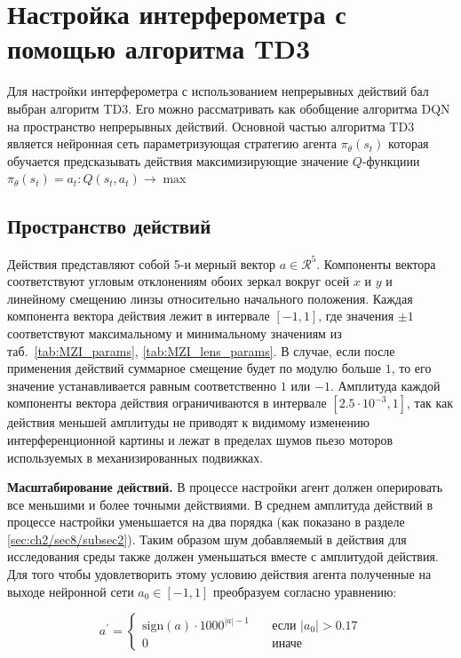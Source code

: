                         
\section{Настройка интерферометра с помощью алгоритма TD3}

Для настройки интерферометра с использованием непрерывных действий бал выбран алгоритм TD3. Его можно рассматривать как обобщение алгоритма DQN на пространство непрерывных действий. Основной частью алгоритма TD3 является нейронная сеть параметризующая стратегию агента $\pi_{\theta}(s_t)$ которая обучается предсказывать действия максимизирующие значение $Q$-функциии $\pi_{\theta}(s_t) = a_t: Q(s_t, a_t) \to \max$

\subsection{Пространство действий}

Действия представляют собой 5-и мерный вектор $a \in \mathcal{R}^5$. Компоненты вектора соответствуют угловым отклонениям обоих зеркал вокруг осей $x$ и $y$ и линейному смещению линзы относительно начального положения. Каждая компонента вектора действия лежит в интервале $[-1,1]$, где значения $\pm 1$ соответствуют максимальному и минимальному значениям из таб.~\ref{tab:MZI_params}, \ref{tab:MZI_lens_params}. В случае, если после применения действий суммарное смещение будет по модулю больше $1$, то его значение устанавливается равным соответственно $1$ или $-1$.
Амплитуда каждой компоненты вектора действия ограничиваются в интервале $[2.5 \cdot 10^{-3}, 1]$, так как действия меньшей амплитуды не приводят к видимому изменению интерференционной картины и лежат в пределах шумов пьезо моторов используемых в механизированных подвижках.

\textbf{Масштабирование действий.} 
В процессе настройки агент должен оперировать все меньшими и более точными действиями. В среднем амплитуда действий в процессе настройки уменьшается на два порядка (как показано в разделе \ref{sec:ch2/sec8/subsec2}). Таким образом шум добавляемый в действия для исследования среды также должен уменьшаться вместе с амплитудой действия. Для того чтобы удовлетворить этому условию действия агента полученные на выходе нейронной сети  $a_0\in[-1,1]$ преобразуем согласно уравнению:

\begin{equation}
a^{\prime} =
   \begin{cases}
    {\mathrm{sign}}(a) \cdot 1000^{|a| - 1}  & \quad \text{если $|a_0| > 0.17$} 
    \\
    0  & \quad \text{иначе}
  \end{cases}
\label{eq:rescale}
\end{equation}

